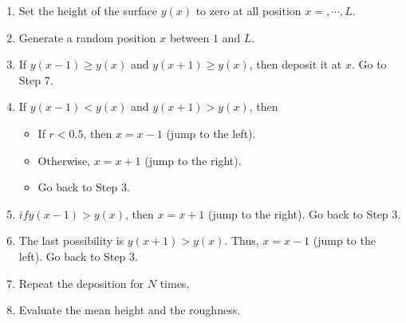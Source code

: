 \begin{myalgobox}

\medskip
\begin{minipage}{5.5in}
\begin{enumerate}
\item Set the height of the surface $y(x)$ to zero at all position $x=, \cdots, L$.
\item Generate a random position $x$ between $1$ and $L$. 
\item If $y(x-1) \geq y(x)$ and $y(x+1) \geq y(x)$, then deposit it at $x$. Go to Step 7.
\item If $y(x-1) < y(x)$ and $y(x+1) > y(x)$, then 
\begin{itemize}
\item If $r<0.5$, then $x=x-1$ (jump to the left).  
\item Otherwise, $x=x+1$ (jump to the right).
\item Go back to Step 3.
\end{itemize}
\item $if y(x-1)> y(x)$, then $x=x+1$ (jump to the right).  Go back to Step 3.
\item The last possibility is $y(x+1)>y(x)$.  Thus, $x=x-1$ (jump to the left).  Go back to Step 3.
\item Repeat the deposition for $N$ times.
\item Evaluate the mean height and the roughness.
\end{enumerate}
\end{minipage}

\end{myalgobox}


